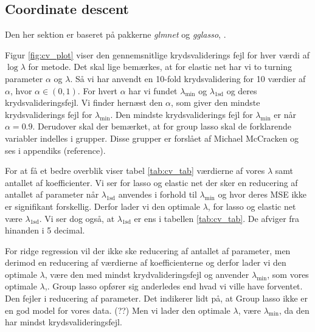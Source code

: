 \subsection{Coordinate descent}
Den her sektion er baseret på pakkerne \textit{glmnet} og \textit{gglasso}, \citep{gglasso}.

Figur \ref{fig:cv_plot} viser den gennemsnitlige krydsvaliderings fejl for hver værdi af $\log \lambda$ for metode.
Det skal lige bemærkes, at for elastic net har vi to turning parameter $\alpha$ og $\lambda$. 
Så vi har anvendt en 10-fold krydsvalidering for 10 værdier af $\alpha$, hvor $\alpha \in (0,1)$. 
For hvert $\alpha$ har vi fundet $\lambda_{\min}$ og $\lambda_{1\text{sd}}$ og deres krydsvalideringsfejl. 
Vi finder hernæst den $\alpha$, som giver den mindste krydsvaliderings fejl for $\lambda_{\min}$. 
Den mindste krydsvaliderings fejl for $\lambda_{\min}$ er når $\alpha =0.9$. 
Derudover skal der bemærket, at for group lasso skal de forklarende variabler indelles i  grupper. 
Disse grupper er forslået af Michael McCracken og ses i appendiks (reference).




For at få et bedre overblik viser tabel  \ref{tab:cv_tab} værdierne af vores $\lambda$ samt antallet af koefficienter. 
Vi ser for lasso og elastic net der sker en reducering af antallet af parameter når $\lambda_{1\text{sd}}$ anvendes i forhold til $\lambda_{\min}$ og hvor deres MSE ikke er signifikant forskellig.  
Derfor lader vi den optimale $\lambda$, for lasso og elastic net være $\lambda_{1\text{sd}}$.
Vi ser dog også, at $\lambda_{1\text{sd}}$ er ens i tabellen \ref{tab:cv_tab}. 
De afviger fra hinanden i 5 decimal.  

For ridge regression vil der ikke ske reducering af antallet af parameter, men derimod en reducering af værdierne af koefficienterne og derfor lader vi den optimale $\lambda$, være den med mindst krydvalideringsfejl og anvender $\lambda_{\min}$, som vores optimale $\lambda$,. 
%
Group lasso opfører sig anderledes end hvad vi ville have forventet. 
Den fejler i reducering af parameter. 
Det indikerer lidt på, at Group lasso ikke er en god model for vores data. (??)
Men vi lader den optimale $\lambda$, være $\lambda_{\min}$, da den har mindst krydsvalideringsfejl. 

